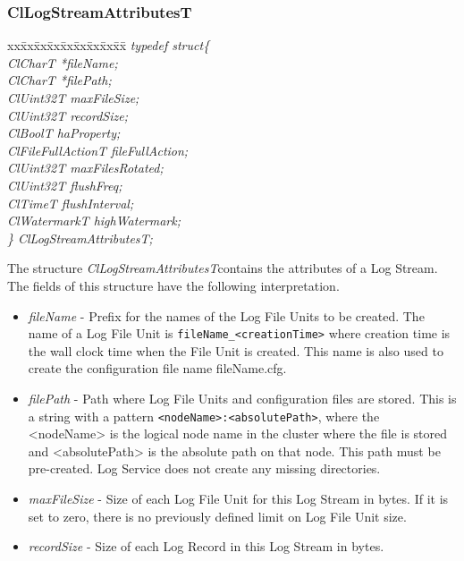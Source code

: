 \begin{flushleft}
\subsubsection{ClLogStreamAttributesT}
\begin{tabbing}
xx\=xx\=xx\=xx\=xx\=xx\=xx\=xx\=xx\=\kill
\textit{typedef struct\{}\\
\>\>\>\>\textit{ClCharT		*fileName;}\\
\>\>\>\>\textit{ClCharT		*filePath;}\\
\>\>\>\>\textit{ClUint32T		maxFileSize;}\\
\>\>\>\>\textit{ClUint32T		recordSize;}\\
\>\>\>\>\textit{ClBoolT		haProperty;}\\
\>\>\>\>\textit{ClFileFullActionT	fileFullAction;}\\
\>\>\>\>\textit{ClUint32T		maxFilesRotated;}\\
\>\>\>\>\textit{ClUint32T		flushFreq;}\\
\>\>\>\>\textit{ClTimeT		flushInterval;}\\
\>\>\>\>\textit{ClWatermarkT	highWatermark;}\\
\textit{\} ClLogStreamAttributesT;}\end{tabbing}
The structure \textit{ClLogStreamAttributesT}contains the attributes of a Log Stream. The fields of this structure have the following interpretation.
\begin{itemize}
\item
\textit{fileName} - Prefix for the names of the Log File Units to be created. The name of a Log File Unit is {\tt{fileName\_\-<creationTime>}} where creation
time is the wall clock time when the File Unit is created. This name is also used to create the configuration file name fileName.cfg.
\item
\textit{filePath} - Path where Log File Units and configuration files are stored. This is a string with a pattern {\tt{<nodeName>:<absolutePath>}}, where
the <nodeName> is the logical node name in the cluster where the file is stored and <absolutePath> is the absolute path on that node. This path must
be pre-created. Log Service does not create any missing directories.
\item
\textit{maxFileSize} - Size of each Log File Unit for this Log Stream in bytes. If it is set to zero, there is no previously defined limit on 
Log File Unit size.
\item
\textit{recordSize} - Size of each Log Record in this Log Stream in bytes.

\end{itemize}
\end{flushleft}
